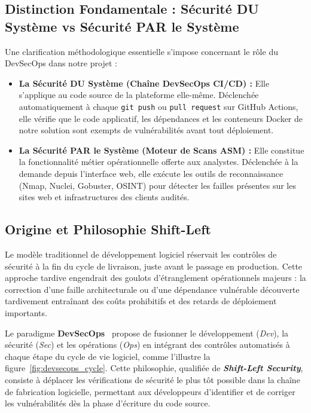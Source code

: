 \subsection{Distinction Fondamentale : S\'ecurit\'e DU Syst\`eme vs S\'ecurit\'e PAR le Syst\`eme}
\par Une clarification m\'ethodologique essentielle s'impose concernant le r\^ole du DevSecOps dans notre projet :
\begin{itemize}
    \item \textbf{La S\'ecurit\'e DU Syst\`eme (Cha\^ine DevSecOps CI/CD) :} Elle s'applique au code source de la plateforme elle-m\^eme. D\'eclench\'ee automatiquement \`a chaque \texttt{git push} ou \texttt{pull request} sur GitHub Actions, elle v\'erifie que le code applicatif, les d\'ependances et les conteneurs Docker de notre solution sont exempts de vuln\'erabilit\'es avant tout d\'eploiement.
    \item \textbf{La S\'ecurit\'e PAR le Syst\`eme (Moteur de Scans ASM) :} Elle constitue la fonctionnalit\'e m\'etier op\'erationnelle offerte aux analystes. D\'eclench\'ee \`a la demande depuis l'interface web, elle ex\'ecute les outils de reconnaissance (Nmap, Nuclei, Gobuster, OSINT) pour d\'etecter les failles pr\'esentes sur les sites web et infrastructures des clients audit\'es.
\end{itemize}

\subsection{Origine et Philosophie Shift-Left}
\par Le mod\`ele traditionnel de d\'eveloppement logiciel r\'eservait les contr\^oles de s\'ecurit\'e \`a la fin du cycle de livraison, juste avant le passage en production. Cette approche tardive engendrait des goulots d'\'etranglement op\'erationnels majeurs : la correction d'une faille architecturale ou d'une d\'ependance vuln\'erable d\'ecouverte tardivement entra\^inant des co\^uts prohibitifs et des retards de d\'eploiement importants.
\par Le paradigme \textbf{DevSecOps}~\cite{devsecops} propose de fusionner le d\'eveloppement (\textit{Dev}), la s\'ecurit\'e (\textit{Sec}) et les op\'erations (\textit{Ops}) en int\'egrant des contr\^oles automatis\'es \`a chaque \'etape du cycle de vie logiciel, comme l'illustre la figure~\ref{fig:devsecops_cycle}. Cette philosophie, qualifi\'ee de \textbf{\textit{Shift-Left Security}}, consiste \`a d\'eplacer les v\'erifications de s\'ecurit\'e le plus t\^ot possible dans la cha\^ine de fabrication logicielle, permettant aux d\'eveloppeurs d'identifier et de corriger les vuln\'erabilit\'es d\`es la phase d'\'ecriture du code source.


